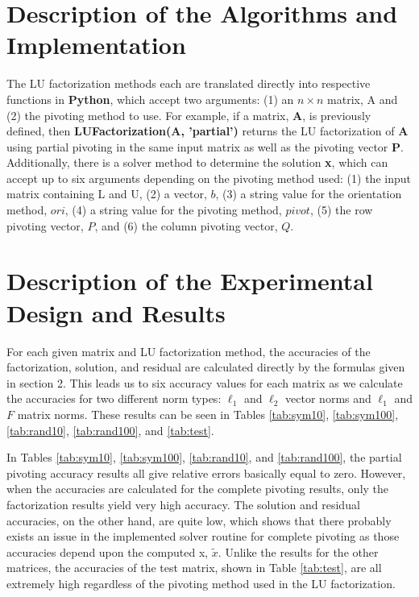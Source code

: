 \documentclass[11pt]{article}
\begin{document}
\section{Description of the Algorithms and Implementation}

The LU factorization methods each are translated directly into respective functions in \textbf{Python}, which accept two arguments: (1) an $n\times n$ matrix, A and (2) the pivoting method to use. For example, if a matrix, \textbf{A}, is previously defined, then \textbf{LUFactorization(A, 'partial')} returns the LU factorization of \textbf{A} using partial pivoting in the same input matrix as well as the pivoting vector \textbf{P}. Additionally, there is a solver method to determine the solution \textbf{x}, which can accept up to six arguments depending on the pivoting method used: (1) the input matrix containing L and U, (2) a vector, $b$, (3) a string value for the orientation method, $ori$, (4)  a string value for the pivoting method, $pivot$, (5) the row pivoting vector, $P$, and (6) the column pivoting vector, $Q$.

\section{Description of the Experimental Design and Results}

For each given matrix and LU factorization method, the accuracies of the factorization, solution, and residual are calculated directly by the formulas given in section 2. This leads us to six accuracy values for each matrix as we calculate the accuracies for two different norm types: $\ell_1$ and $\ell_2$ vector norms and $\ell_1$ and $F$ matrix norms. These results can be seen in Tables  \ref{tab:sym10}, \ref{tab:sym100}, \ref{tab:rand10}, \ref{tab:rand100}, and \ref{tab:test}.

In Tables \ref{tab:sym10}, \ref{tab:sym100}, \ref{tab:rand10}, and \ref{tab:rand100}, the partial pivoting accuracy results all give relative errors basically equal to zero. However, when the accuracies are calculated for the complete pivoting results, only the factorization results yield very high accuracy. The solution and residual accuracies, on the other hand, are quite low, which shows that there probably exists an issue in the implemented solver routine for complete pivoting as those accuracies depend upon the computed x, $\tilde{x}$. Unlike the results for the other matrices, the accuracies of the test matrix, shown in Table \ref{tab:test}, are all extremely high regardless of the pivoting method used in the LU factorization.  
\end{document}
